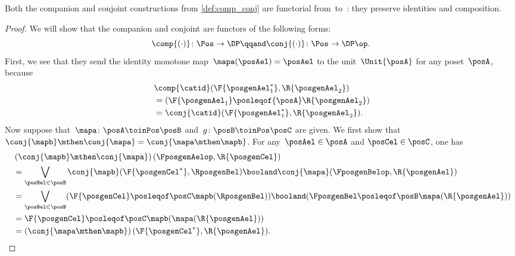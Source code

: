 \begin{lemma}
    \label{lem:comp_conj}
    Both the companion and conjoint constructions from \cref{def:comp_conj} are functorial from~\Pos to~\DP: they preserve identities and composition.
\end{lemma}
\begin{proof}
    We will show that the companion and conjoint are functors of the following forms:
    \begin{equation}
        \comp{(\cdot)}\colon\Pos\to\DP
        \qqand
        \conj{(\cdot)}\colon\Pos\to\DP\op.
    \end{equation}
    First, we see that they send the identity monotone map~$\mapa(\posAel)=\posAel$ to the unit~$\Unit{\posA }$ for any poset~$\posA$, because
    \begin{equation}
        \begin{aligned}
            ~ & \comp{\catid}(\F{\posgenAel_1^*},\R{\posgenAel_2})     \\
              & = (\F{\posgenAel_1} \posleqof{\posA} \R{\posgenAel_2}) \\
              & =\conj{\catid}(\F{\posgenAel_1^*},\R{\posgenAel_2}).
        \end{aligned}
    \end{equation}
    Now suppose that~$\mapa\colon  \posA \toinPos \posB $ and~$g\colon \posB \toinPos \posC$ are given.
    We first show that $\conj{\mapb}\mthen\conj{\mapa}=\conj{\mapa\mthen \mapb}$.
    For any~$\posAel\in \posA$ and $\posCel\in \posC$, one has
    \begin{equation}
        \begin{aligned}
            ~ & \left(\conj{\mapb}\mthen \conj{\mapa}\right)(\FposgenAelop,\R{\posgenCel})                                                               \\
              & =\bigvee_{\posBel\in \posB} \conj{\mapb}(\F{\posgenCel^*},\RposgenBel)\booland\conj{\mapa}(\FposgenBelop,\R{\posgenAel})                 \\
              & =\bigvee_{\posBel\in \posB} (\F{\posgenCel}\posleqof\posC \mapb(\RposgenBel)) \booland (\FposgenBel\posleqof\posB \mapa(\R{\posgenAel})) \\
              & = \F{\posgenCel}\posleqof\posC \mapb(\mapa(\R{\posgenAel}))                                                                              \\
              & =\left(\conj{\mapa\mthen \mapb}\right)(\F{\posgenCel^*},\R{\posgenAel}).
        \end{aligned}

\end{equation}
\end{proof}

